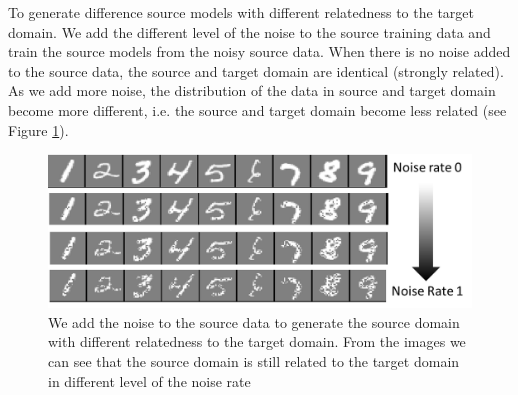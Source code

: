 To generate difference source models with different relatedness to the target domain. We add the different level of the noise to the source training data and train the source models from the noisy source data. When there is no noise added to the source data, the source and target domain are identical (strongly related). As we add more noise, the distribution of the data in source and target domain become more different, i.e. the source and target domain become less related (see Figure \ref{fig:noise}).

\begin{figure}
\centering
\includegraphics[scale=0.45]{fig/noise.png}
\caption{We add the noise to the source data to generate the source domain with different relatedness to the target domain. From the images we  can see that the source domain is still related to the target domain in different level of the noise rate}\label{fig:noise}
\end{figure}

